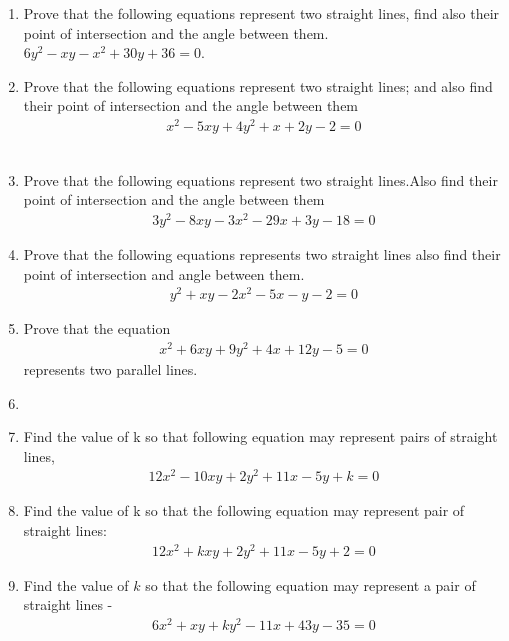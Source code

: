 \renewcommand{\theequation}{\theenumi}
\renewcommand{\thefigure}{\theenumi}
\begin{enumerate}[label=\thesubsection.\arabic*.,ref=\thesubsection.\theenumi]
%
\item Prove that the following equations represent two straight lines, find also their point of intersection and the angle between them.\\
$6y^2-xy-x^2+30y+36=0$.
%
\\
\solution

\item Prove that the following equations represent two straight lines; and also find their point of intersection and the angle between them
\begin{align}\nonumber
    x^2-5xy+4y^2+x+2y-2=0
\end{align}
\\
\solution

\item Prove that the following equations represent two straight lines.Also find their point of intersection and the angle between them
\begin{align}
 3y^2-8xy-3x^2-29x+3y-18=0   
\label{eq:solutions/13/3/1}
\end{align}
\solution

\item Prove that the following equations represents two straight lines also find their point of intersection and angle between them.
\begin{align}
y^2+xy-2x^2-5x-y-2=0
\end{align}
%
\solution

\item Prove that the equation
\begin{align} 
    x^{2}+6xy+9y^{2}+4x+12y-5=0 \label{eq:solutions/13/5/eq:0}
\end{align}
represents two parallel lines.

\solution

\item 
%
\solution

%
\item Find the value of k so that following equation may represent pairs of straight lines,
\begin{align}
12x^2-10xy+2y^2+11x-5y+k=0
\label{eq:solutions/13/7/1}
\end{align}
%
\solution

\item Find the value of k so that the following equation may represent pair of straight lines: 
\begin{align}
    12x^2+kxy+2y^2+11x-5y+2=0\label{eq:solutions/13/8/1.1}
\end{align}
\solution

%
\item Find the value of $k$ so that the following equation may represent a pair of straight lines - 
\begin{align}
6x^2 +xy+ky^2-11x+43y-35 = 0 \label{eq:solutions/13/94}
\end{align}
\solution



\end{enumerate}
